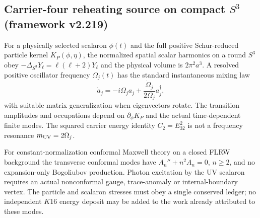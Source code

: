 \documentclass[12pt,a4paper]{article}
\begin{document}
\subsection{Carrier-four reheating source on compact $S^3$ (framework v2.219)}
\label{p4:sec:v2219-s3-reheating}
\begin{proposition}
\label{p4:prop:v2219-uv-bogoliubov}
For a physically selected scalaron $\phi(t)$ and the full positive
Schur-reduced particle kernel $K_P(\phi,\eta)$, the normalized spatial
scalar harmonics on a round $S^3$ obey
$-\Delta_{S^3}Y_\ell=\ell(\ell+2)Y_\ell$ and the physical volume is
$2\pi^2a^3$.  A resolved positive oscillator frequency $\Omega_j(t)$
has the standard instantaneous mixing law
\[
 \dot a_j=-i\Omega_ja_j+\frac{\dot\Omega_j}{2\Omega_j}a_j^\dagger,
\]
with suitable matrix generalization when eigenvectors rotate.
The transition amplitudes and occupations depend on
$\partial_\phi K_P$ and the actual time-dependent finite modes.
The squared carrier energy identity $C_2=E_{32}^2$ is not a
frequency resonance $m_{\rm UV}=2\Omega_j$.
\end{proposition}
\begin{remark}
\leavevmode\par\noindent
For constant-normalization conformal Maxwell theory on a closed FLRW
background the transverse conformal modes have
$A_n''+n^2A_n=0$, $n\ge2$, and no expansion-only Bogoliubov
production.  Photon excitation by the UV scalaron requires an
actual nonconformal gauge, trace-anomaly or internal-boundary vertex.
The particle and scalaron stresses must obey a single conserved ledger;
no independent $K16$ energy deposit may be added to the work already
attributed to these modes.
\end{remark}


\end{document}

